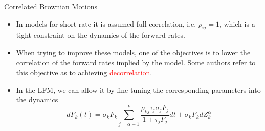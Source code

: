 \documentclass{beamer}
\begin{document}
\begin{frame}{Correlated Brownian Motions}
	\begin{itemize}
		\item In models for short rate it is assumed full correlation, i.e. $\rho_{ij}=1$, which is a tight constraint on the dynamics of the forward rates.
		\item When trying to improve these models, one of the objectives is to lower the correlation of the forward rates implied by the model. Some authors refer to this objective as to achieving \textcolor{red}{decorrelation}. 
		\item In the LFM, we can allow it by fine-tuning the corresponding parameters into the dynamics \begin{equation*}
			dF_k(t) = \sigma_kF_k\sum_{j=\alpha+1}^k\frac{\boxed{\rho_{kj}}\tau_j\sigma_jF_j}{1+\tau_jF_j}dt+\sigma_kF_k dZ^\alpha_k
		\end{equation*}
	\end{itemize}
\end{frame}
\end{document}
